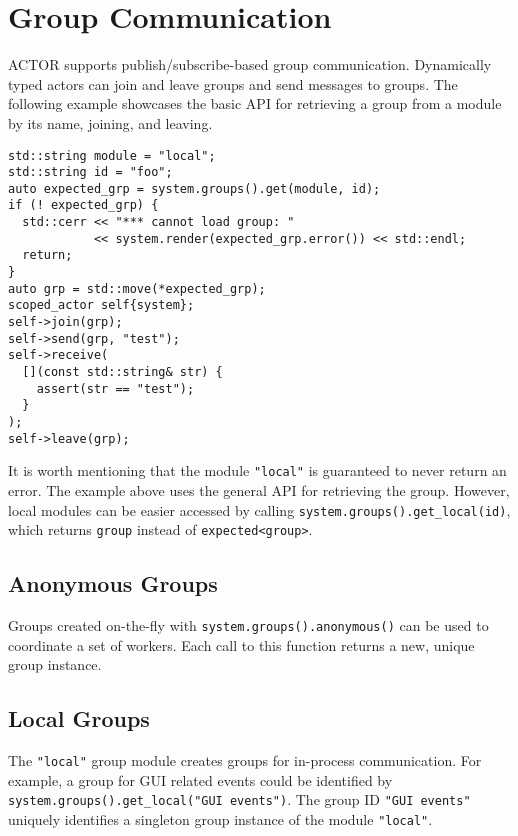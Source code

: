 \section{Group Communication}
\label{groups}

ACTOR supports publish/subscribe-based group communication. Dynamically typed
actors can join and leave groups and send messages to groups. The following
example showcases the basic API for retrieving a group from a module by its
name, joining, and leaving.

\begin{lstlisting}
std::string module = "local";
std::string id = "foo";
auto expected_grp = system.groups().get(module, id);
if (! expected_grp) {
  std::cerr << "*** cannot load group: "
            << system.render(expected_grp.error()) << std::endl;
  return;
}
auto grp = std::move(*expected_grp);
scoped_actor self{system};
self->join(grp);
self->send(grp, "test");
self->receive(
  [](const std::string& str) {
    assert(str == "test");
  }
);
self->leave(grp);
\end{lstlisting}

It is worth mentioning that the module \lstinline`"local"` is guaranteed to
never return an error. The example above uses the general API for retrieving
the group. However, local modules can be easier accessed by calling
\lstinline`system.groups().get_local(id)`, which returns \lstinline`group`
instead of \lstinline`expected<group>`.

\subsection{Anonymous Groups}
\label{anonymous-group}

Groups created on-the-fly with \lstinline^system.groups().anonymous()^ can be
used to coordinate a set of workers. Each call to this function returns a new,
unique group instance.

\subsection{Local Groups}
\label{local-group}

The \lstinline^"local"^ group module creates groups for in-process
communication. For example, a group for GUI related events could be identified
by \lstinline^system.groups().get_local("GUI events")^. The group ID
\lstinline^"GUI events"^ uniquely identifies a singleton group instance of the
module \lstinline^"local"^.

